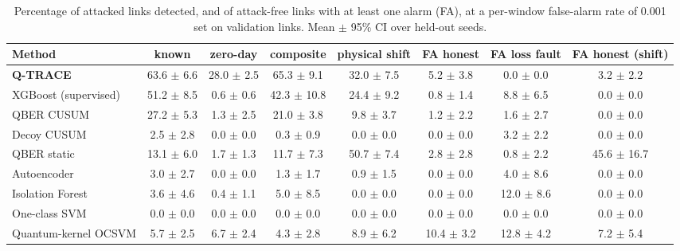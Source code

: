 \begin{table}[t]
\centering
\caption{Percentage of attacked links detected, and of attack-free links with at least one alarm (FA), at a per-window false-alarm rate of 0.001 set on validation links. Mean $\pm$ 95\% CI over held-out seeds.}
\label{tab:detection0001}
\begin{tabular}{lccccccc}
\toprule
Method & known & zero-day & composite & physical shift & FA honest & FA loss fault & FA honest (shift) \\
\midrule
\textbf{Q-TRACE} & 63.6 $\pm$ 6.6 & 28.0 $\pm$ 2.5 & 65.3 $\pm$ 9.1 & 32.0 $\pm$ 7.5 & 5.2 $\pm$ 3.8 & 0.0 $\pm$ 0.0 & 3.2 $\pm$ 2.2 \\
XGBoost (supervised) & 51.2 $\pm$ 8.5 & 0.6 $\pm$ 0.6 & 42.3 $\pm$ 10.8 & 24.4 $\pm$ 9.2 & 0.8 $\pm$ 1.4 & 8.8 $\pm$ 6.5 & 0.0 $\pm$ 0.0 \\
QBER CUSUM & 27.2 $\pm$ 5.3 & 1.3 $\pm$ 2.5 & 21.0 $\pm$ 3.8 & 9.8 $\pm$ 3.7 & 1.2 $\pm$ 2.2 & 1.6 $\pm$ 2.7 & 0.0 $\pm$ 0.0 \\
Decoy CUSUM & 2.5 $\pm$ 2.8 & 0.0 $\pm$ 0.0 & 0.3 $\pm$ 0.9 & 0.0 $\pm$ 0.0 & 0.0 $\pm$ 0.0 & 3.2 $\pm$ 2.2 & 0.0 $\pm$ 0.0 \\
QBER static & 13.1 $\pm$ 6.0 & 1.7 $\pm$ 1.3 & 11.7 $\pm$ 7.3 & 50.7 $\pm$ 7.4 & 2.8 $\pm$ 2.8 & 0.8 $\pm$ 2.2 & 45.6 $\pm$ 16.7 \\
Autoencoder & 3.0 $\pm$ 2.7 & 0.0 $\pm$ 0.0 & 1.3 $\pm$ 1.7 & 0.9 $\pm$ 1.5 & 0.0 $\pm$ 0.0 & 4.0 $\pm$ 8.6 & 0.0 $\pm$ 0.0 \\
Isolation Forest & 3.6 $\pm$ 4.6 & 0.4 $\pm$ 1.1 & 5.0 $\pm$ 8.5 & 0.0 $\pm$ 0.0 & 0.0 $\pm$ 0.0 & 12.0 $\pm$ 8.6 & 0.0 $\pm$ 0.0 \\
One-class SVM & 0.0 $\pm$ 0.0 & 0.0 $\pm$ 0.0 & 0.0 $\pm$ 0.0 & 0.0 $\pm$ 0.0 & 0.0 $\pm$ 0.0 & 0.0 $\pm$ 0.0 & 0.0 $\pm$ 0.0 \\
Quantum-kernel OCSVM & 5.7 $\pm$ 2.5 & 6.7 $\pm$ 2.4 & 4.3 $\pm$ 2.8 & 8.9 $\pm$ 6.2 & 10.4 $\pm$ 3.2 & 12.8 $\pm$ 4.2 & 7.2 $\pm$ 5.4 \\
\bottomrule
\end{tabular}
\end{table}
